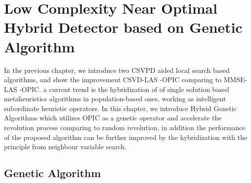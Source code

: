 \resetdatestamp

\chapter{Low Complexity Near Optimal Hybrid Detector based on Genetic Algorithm}
In the previous chapter, we introduce two CSVPD aided local search based algorithms, and show the improvement CSVD-LAS -OPIC comparing to MMSE-LAS -OPIC.    
a current trend is the hybridization of of single solution based metaheuristics algorithms in population-based ones, working as intelligent subordinate heuristic operators. In this chapter, we introduce Hybrid Genetic Algorithms which utilizes OPIC as a genetic operator and accelerate the revolution process comparing to random revolution, in addition the performance of the proposed algorithm can be further improved by the hybridization with the principle from neighbour variable search. 
\section{Genetic Algorithm}
 